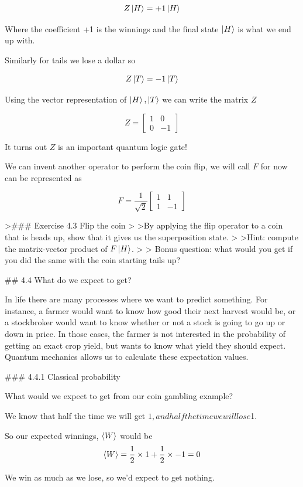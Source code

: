 \documentclass{book}
\begin{document}
$$
Z\ket{H} = +1 \ket{H}
$$

Where the coefficient +1 is the winnings and the final state $\ket{H}$ is what we end up with. 

Similarly for tails we lose a dollar so 

$$
Z\ket{T} = -1 \ket{T}
$$

Using the vector representation of $\ket{H}, \ket{T}$ we can write the matrix $Z$

$$ Z = \begin{bmatrix} 1 & 0 \\ 0 & -1 \end{bmatrix} $$

It turns out $Z$ is an important quantum logic gate!


We can invent another operator to perform the coin flip, we will call $F$ for now can be represented as 

$$
F =  \frac{1}{\sqrt{2}} \begin{bmatrix} 1 & 1 \\ 1 & -1 \end{bmatrix}
$$

>### Exercise 4.3 Flip the coin 
>
>By applying the flip operator to a coin that is heads up, show that it gives us the superposition state. 
>
>Hint: compute the matrix-vector product of $F\ket{H}$. 
>
> Bonus question: what would you get if you did the same with the coin starting tails up?

## 4.4 What do we expect to get?

In life there are many processes where we want to predict something. For instance, a farmer would want to know how good their next harvest would be, or a stockbroker would want to know whether or not a stock is going to go up or down in price. In those cases, the farmer is not interested in the probability of getting an exact crop yield, but wants to know what yield they should expect. Quantum mechanics allows us to calculate these expectation values.

### 4.4.1 Classical probability 

What would we expect to get from our coin gambling example? 

We know that half the time we will get $1, and half the time we will lose $1. 

So our expected winnings, $\braket{W}$ would be
$$
\braket{W} = \frac{1}{2} \times 1 + \frac{1}{2} \times -1 
=0
$$

We win as much as we lose, so we'd expect to get nothing. 
\end{document}
